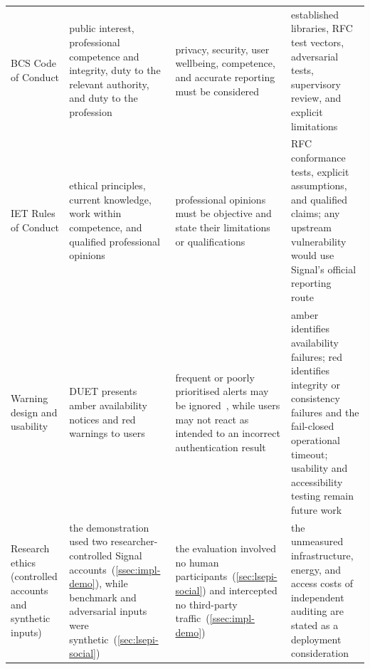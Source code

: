 \begin{table}[p]
\begin{tabularx}{\textwidth}{@{}>{\raggedright\arraybackslash}p{2.5cm}>{\raggedright\arraybackslash}X>{\raggedright\arraybackslash}X>{\raggedright\arraybackslash}X@{}}
BCS Code of Conduct &
public interest, professional competence and integrity, duty to the relevant authority, and duty to the profession~\cite{bcs-code} &
privacy, security, user wellbeing, competence, and accurate reporting must be considered~\cite{bcs-code} &
established libraries, RFC test vectors, adversarial tests, supervisory review, and explicit limitations \\

IET Rules of Conduct &
ethical principles, current knowledge, work within competence, and qualified professional opinions~\cite[Rules~2, 5, 6, and 26]{iet-conduct} &
professional opinions must be objective and state their limitations or qualifications~\cite[Rule~26]{iet-conduct} &
RFC conformance tests, explicit assumptions, and qualified claims; any upstream vulnerability would use Signal's official reporting route~\cite{signal-security-report} \\

Warning design and usability &
DUET presents amber availability notices and red warnings to users &
frequent or poorly prioritised alerts may be ignored~\cite{ewaschuk2016monitoring,laubheimer2022alertfatigue}, while users may not react as intended to an incorrect authentication result~\cite[Section~4.1]{haring2024whistleblower} &
amber identifies availability failures; red identifies integrity or consistency failures and the fail-closed operational timeout; usability and accessibility testing remain future work \\

Research ethics (controlled accounts and synthetic inputs) &
the demonstration used two researcher-controlled Signal accounts~(\cref{ssec:impl-demo}), while benchmark and adversarial inputs were synthetic~(\cref{sec:lsepi-social}) &
the evaluation involved no human participants~(\cref{sec:lsepi-social}) and intercepted no third-party traffic~(\cref{ssec:impl-demo}) &
the unmeasured infrastructure, energy, and access costs of independent auditing are stated as a deployment consideration \\
\bottomrule
\end{tabularx}
\end{table}

